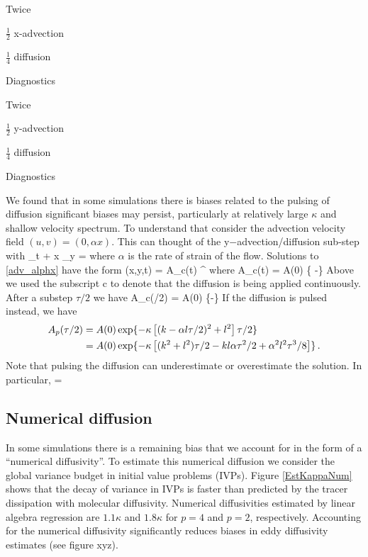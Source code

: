 \documentclass[11pt]{article}
\begin{document}
\noindent Twice
\begin{description}
\item  $\tfrac{1}{2}$ x-advection
\item   $\tfrac{1}{4}$ diffusion
\item   Diagnostics
\end{description}

\noindent  Twice
\begin{description}
\item  $\tfrac{1}{2}$ y-advection
\item   $\tfrac{1}{4}$ diffusion
\item   Diagnostics
\end{description}

We found that in some simulations there is biases related to the pulsing of diffusion significant biases may persist, particularly at relatively large $\kappa$ and shallow velocity spectrum. To understand that consider the advection velocity field $(u,v) = (0,\alpha x)$. This can thought of the y$-$advection/diffusion sub-step with 
\beq
\label{adv_alphx}
\vth_t + \alpha x \vth_y = \kappa \lap \vth\com
\eeq
where $\alpha$ is the rate of strain of the flow. Solutions to \eqref{adv_alphx} have the form
\beq
\vth(x,y,t) = A_c(t) \ee^{\ii[(k- \alpha l t)x + l y]}\com
\eeq
where
\beq
A_c(t) = A(0) \exp\{ -\kappa{}\}\per
\eeq
Above we used the subscript c to denote that the diffusion is being applied continuously. After a
substep $\tau/2$ we have
\beq
A_c(\tau/2) = A(0) \exp\{-\kappa{}\}\per
\eeq
If the diffusion is pulsed instead, we have
\begin{align}
A_p(\tau/2) &= A(0) \exp \{ -\kappa \left[ (k - \alpha l \tau/2)^2 + l^2  \right]\tau/2\} \nonumber \\
&= A(0) \exp\{-\kappa \left[ (k^2 + l^2) \tau/2 -  k l \alpha \tau^2/2+ \alpha^2 l^2 \tau^3/8 \right] \} \, .
\end{align}
Note that pulsing the diffusion can underestimate or overestimate the solution. In particular,
\beq
{} =  \per
\eeq

\subsection{Numerical diffusion}
In some simulations there is a remaining bias that we account for in the form of a ``numerical diffusivity''. To estimate this numerical diffusion we consider the global variance budget in initial value problems (IVPs). Figure \ref{EstKappaNum} shows that the decay of variance in IVPs is faster than predicted by the tracer dissipation with molecular diffusivity. Numerical diffusivities  estimated by linear algebra regression are $ 1.1 \kappa$ and $1.8 \kappa$ for $p=4$ and $p=2$, respectively. Accounting for the numerical diffusivity significantly reduces biases in eddy diffusivity estimates (see figure xyz).
\end{document}
